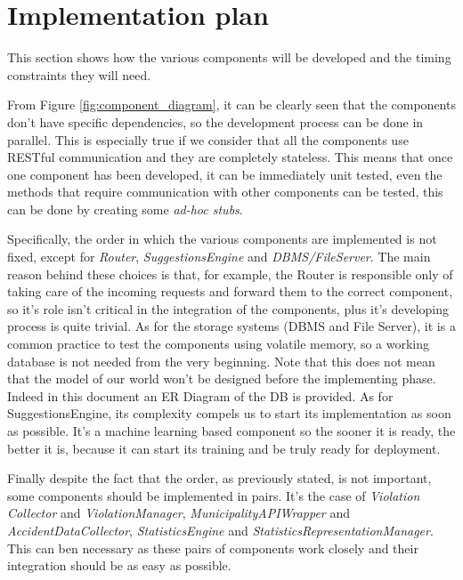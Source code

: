 \section{Implementation plan}
This section shows how the various components will be developed
and the timing constraints they will need. 

From Figure \ref{fig:component_diagram}, it can be clearly seen that the
components don't have specific dependencies, so the development process can be
done in parallel. This is especially true if we consider that all the components
use RESTful communication and they are completely stateless. This means that
once one component has been developed, it can be immediately unit tested, even
the methods that require communication with other components can be tested, this
can be done by creating some \emph{ad-hoc stubs}.

Specifically, the order in which the various components are implemented is not
fixed, except for \emph{Router}, \emph{SuggestionsEngine} and
\emph{DBMS/FileServer}. The main reason behind these choices is that, for
example, the Router is responsible only of taking care of the incoming requests
and forward them to the correct component, so it's role isn't critical in the
integration of the components, plus it's developing process is quite trivial. As
for the storage systems (DBMS and File Server), it is a common practice to test
the components using volatile memory, so a working database is not needed from
the very beginning. Note that this does not mean that the model of our world
won't be designed before the implementing phase. Indeed in this document an ER
Diagram of the DB is provided. As for SuggestionsEngine, its complexity compels
us to start its implementation as soon as possible. It's a machine learning
based component so the sooner it is ready, the better it is, because it can
start its training and be truly ready for deployment.

Finally despite the fact that the order, as previously stated, is not important,
some components should be implemented in pairs. It's the case of \emph{Violation
Collector} and \emph{ViolationManager}, \emph{MunicipalityAPIWrapper} and
\emph{AccidentDataCollector}, \emph{StatisticsEngine} and
\emph{StatisticsRepresentationManager}. This can ben necessary as these pairs of
components work closely and their integration should be as easy as possible.